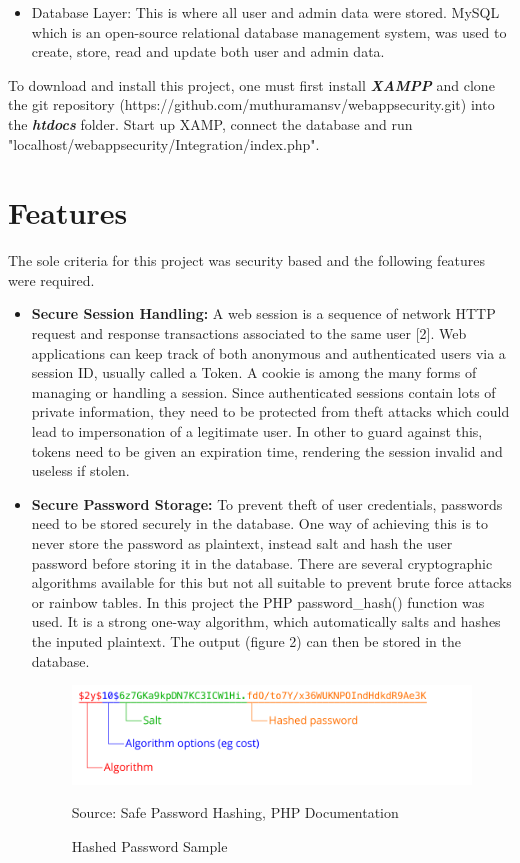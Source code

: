 \documentclass[12pt,a4paper]{article}
\begin{document}
\begin{flushleft}
\begin{itemize}
		\item Database Layer: This is where all user and admin data were stored. MySQL which is an open-source relational database management system, was used to create, store, read and update both user and admin data.
	\end{itemize}
	To download and install this project, one must first install \textbf{\textit{XAMPP}} and clone the git repository (https://github.com/muthuramansv/webappsecurity.git) into the \textbf{\textit{htdocs}} folder. Start up XAMP, connect the database and run "localhost/webappsecurity/Integration/index.php".
	
	
	
	\section{Features}
	The sole criteria for this project was security based and the following features were required.
	\begin{itemize}
		\item \textbf{Secure Session Handling:} A web session is a sequence of network HTTP request and response transactions associated to the same user [2]. 
		Web applications can keep track of both anonymous and authenticated users via a session ID, usually called a Token. A cookie is among the many forms of managing or handling a session. Since authenticated sessions contain lots of private information, they need to be protected from theft attacks which could lead to impersonation of a legitimate user. In other to guard against this, tokens need to be given an expiration time, rendering the session invalid and useless if stolen.
		
		\item \textbf{Secure Password Storage:} To prevent theft of user credentials, passwords need to be stored securely in the database. One way of achieving this is to never store the password as plaintext, instead salt and hash the user password before storing it in the database. There are several cryptographic algorithms available for this but not all suitable to prevent brute force attacks or rainbow tables. In this project the PHP password\_hash() function was used. It is a strong one-way algorithm, which automatically salts and hashes the inputed plaintext. The output (figure 2) can then be stored in the database.
		\begin{figure}[h]
			\begin{center}
				\includegraphics [scale = 0.3] {algo}
				\caption{Hashed Password Sample}
				Source: Safe Password Hashing, PHP Documentation
			\end{center}
		\end{figure}
		

\end{itemize}
\end{flushleft}
\end{document}
